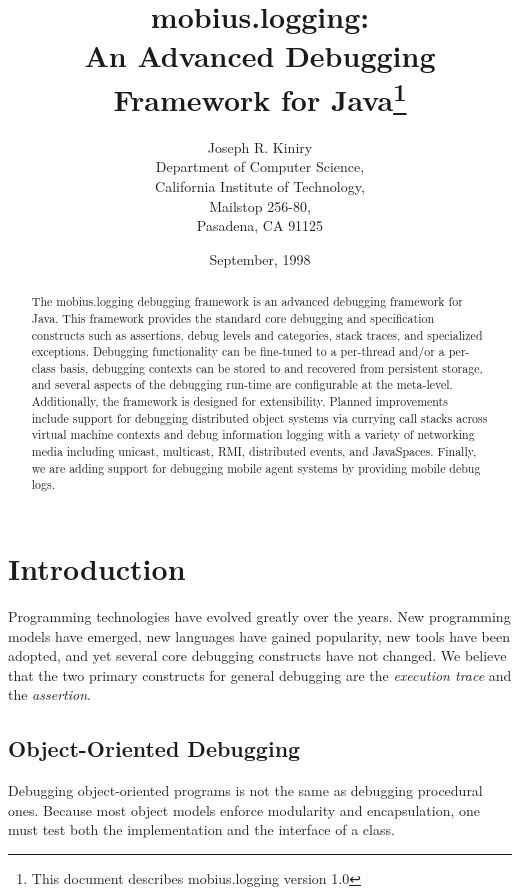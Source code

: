 \documentclass{article}
\title{mobius.logging:\\An Advanced Debugging Framework for Java\thanks{This
document describes mobius.logging version 1.0}}
\author{Joseph R. Kiniry\\
  Department of Computer Science,\\
  California Institute of Technology,\\
  Mailstop 256-80,\\
  Pasadena, CA 91125}
\date{September, 1998}
\begin{document}
\maketitle

\begin{abstract}
  
  The mobius.logging debugging framework is an advanced debugging framework for
  Java.  This framework provides the standard core debugging and
  specification constructs such as assertions, debug levels and categories,
  stack traces, and specialized exceptions.  Debugging functionality can be
  fine-tuned to a per-thread and/or a per-class basis, debugging contexts
  can be stored to and recovered from persistent storage, and several
  aspects of the debugging run-time are configurable at the meta-level.
  Additionally, the framework is designed for extensibility.  Planned
  improvements include support for debugging distributed object systems via
  currying call stacks across virtual machine contexts and debug
  information logging with a variety of networking media including unicast,
  multicast, RMI, distributed events, and JavaSpaces. Finally, we are
  adding support for debugging mobile agent systems by providing mobile
  debug logs.

\end{abstract}

\section{Introduction}

Programming technologies have evolved greatly over the years. New
programming models have emerged, new languages have gained popularity,
new tools have been adopted, and yet several core debugging constructs
have not changed.  We believe that the two primary constructs for
general debugging are the \emph{execution trace} and the
\emph{assertion}.

\subsection{Object-Oriented Debugging}

Debugging object-oriented programs is not the same as debugging
procedural ones.  Because most object models enforce modularity and
encapsulation, one must test both the implementation and the interface
of a class.
\end{document}
